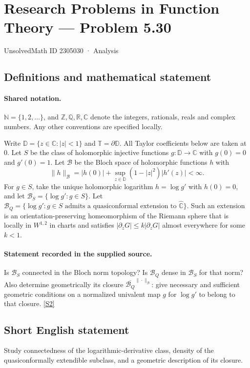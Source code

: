 \documentclass[11pt]{article}
\newcommand{\sref}[2]{\hyperlink{source:#1:#2}{[S#2]}}
\begin{document}
\setcounter{section}{2305029}
\section{Research Problems in Function Theory — Problem 5.30}\label{2305030}
{\small\sffamily UnsolvedMath ID 2305030 · Analysis}
\subsection{Definitions and mathematical statement}

\paragraph{Shared notation.}$\mathbb N=\{1,2,\ldots\}$, and $\mathbb Z,\mathbb Q,\mathbb R,\mathbb C$ denote the integers, rationals, reals and complex numbers. Any other conventions are specified locally.


Write $\mathbb D=\{z\in\mathbb C:|z|<1\}$ and $\mathbb T=\partial\mathbb D$. All Taylor coefficients below are taken at $0$. Let $S$ be the class of holomorphic injective functions $g:\mathbb D\to\mathbb C$ with $g(0)=0$ and $g'(0)=1$. Let $\mathcal B$ be the Bloch space of holomorphic functions $h$ with
\[\|h\|_{\mathcal B}=|h(0)|+\sup_{z\in\mathbb D}(1-|z|^2)|h'(z)|<\infty.
\]
For $g\in S$, take the unique holomorphic logarithm $h=\log g'$ with $h(0)=0$, and let $\mathcal B_S=\{\log g':g\in S\}$. Let $\mathcal B_Q=\{\log g':g\in S\text{ admits a quasiconformal extension to }\widehat{\mathbb C}\}$. Such an extension is an orientation-preserving homeomorphism of the Riemann sphere that is locally in $W^{1,2}$ in charts and satisfies $|\partial_{\bar z}G|\le k|\partial_zG|$ almost everywhere for some $k<1$.
\paragraph{Statement recorded in the supplied source.}
Is $\mathcal B_S$ connected in the Bloch norm topology? Is $\mathcal B_Q$ dense in $\mathcal B_S$ for that norm? Also determine geometrically its closure $\overline{\mathcal B_Q}^{\|\cdot\|_{\mathcal B}}$: give necessary and sufficient geometric conditions on a normalized univalent map $g$ for $\log g'$ to belong to that closure. \sref{2305030}{2}
\subsection{Short English statement}
Study connectedness of the logarithmic-derivative class, density of the quasiconformally extendible subclass, and a geometric description of its closure.
\end{document}

